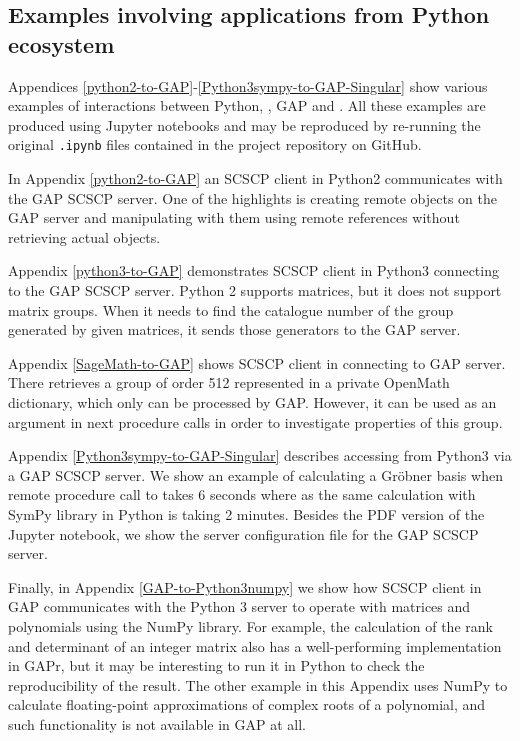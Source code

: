 \documentclass{deliverablereport}
\begin{document}
\subsection{Examples involving applications from Python ecosystem}

Appendices \ref{python2-to-GAP}-\ref{Python3sympy-to-GAP-Singular}
show various examples of interactions between Python, \Sage, GAP 
and \Singular. All these examples are produced using Jupyter notebooks
and may be reproduced by re-running the original {\tt .ipynb} files
contained in the project repository on GitHub.

In Appendix \ref{python2-to-GAP} an SCSCP client in Python2 
communicates with the GAP SCSCP server. One of the highlights is
creating remote objects on the GAP server and manipulating
with them using remote references without retrieving actual
objects.

Appendix \ref{python3-to-GAP} demonstrates SCSCP client in 
Python3 connecting to the GAP SCSCP server. Python 2 supports
matrices, but it does not support matrix groups. When it needs
to find the catalogue number of the group generated by given
matrices, it sends those generators to the GAP server.

Appendix \ref{SageMath-to-GAP} shows SCSCP client in \Sage 
connecting to GAP server. There \Sage retrieves a group of order
512 represented in a private OpenMath dictionary, which only
can be processed by GAP. However, it can be used as an argument
in next procedure calls in order to investigate properties of 
this group.

Appendix \ref{Python3sympy-to-GAP-Singular} describes
accessing \Singular from Python3 via a GAP SCSCP server. 
We show an example of calculating a Gr\"obner basis when
remote procedure call to \Singular takes 6 seconds where
as the same calculation with SymPy library in Python is
taking 2 minutes. Besides the PDF version of the Jupyter
notebook, we show the server configuration file for the
GAP SCSCP server.

Finally, in Appendix \ref{GAP-to-Python3numpy} we show how
SCSCP client in GAP communicates with the Python 3 server
to operate with matrices and polynomials using the NumPy
library. For example, the calculation of the rank and
determinant of an integer matrix also has a well-performing
implementation in GAPr, but it may be interesting to run
it in Python to check the reproducibility of the result.
The other example in this Appendix uses NumPy to calculate
floating-point approximations of complex roots of a 
polynomial, and such functionality is not available in GAP
at all.
\end{document}
